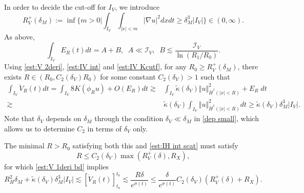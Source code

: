 \documentclass[reqno, 11pt]{amsart}
\numberwithin{equation}{section}
\theoremstyle{plain}
\theoremstyle{definition}
\numberwithin{equation}{section}
\numberwithin{theorem}{section}
\numberwithin{equation}{section}
\numberwithin{equation}{section}
\numberwithin{theorem}{section}
\begin{document}
	In order to decide the cut-off for $I_V$, we introduce
	\begin{equation*}
	R_{V}^{+}(\delta_{M}):=\inf\{m>0\Big|\int_{I_V}\int_{|x|<m} |\nabla u|^2 dxdt\geq \delta_{M}^3|I_V| \}\in (0,\infty).
	\end{equation*}
	As above,
	\begin{equation*}
	\int_{I_V} E_R(t)dt=A+B,\;\;A\ll \mathcal{I}_V,\;\;B\lesssim\frac{\mathcal{I}_V}{\ln (R_1/R_0)}.
	\end{equation*}
	Using \eqref{est:V 2deri}, \eqref{est:IV int} and \eqref{est:IV Kcutf}, for any $R_0 \geq R_{V}^{+}(\delta_{M})$, there exists $R\in \left(R_0,C_2(\delta_{V})R_0 \right)$ for some constant $C_2(\delta_{V})>1$ such that
	\begin{equation*}
	\begin{aligned}
	\int_{I_V} \ddot{V}_R(t)dt= \int_{I_V}8K(\phi_{R}u)
	+O(E_R)dt \gtrsim& \int_{I_V}\widetilde{\kappa}(\delta_{V}) \Vert u \Vert_{\dot H^1(|x|<R)}^2+E_R\; dt\\\gtrsim& \widetilde{\kappa}(\delta_{V})\int_{I_V} \Vert u \Vert_{\dot H^1(|x|<R)}^2 dt\geq \widetilde{\kappa}(\delta_{V})\delta_{M}^3|I_V|.
	\end{aligned}
	\end{equation*}
	Note that $\delta_{V}$ depends on $\delta_{M}$ through the condition $\delta_{V}\ll \delta_{M}$ in \eqref{dep small}, which allows us to determine $C_2$ in terms of $\delta_{V}$ only. 
	
	The minimal $R>R_0$ satisfying both this and \eqref{est:IH int scat} must satisfy
	\begin{equation*}
	R\leq C_2(\delta_{V})\max\left(R_{V}^{+}(\delta),R_X \right),
	\end{equation*}
	for which \eqref{est:V 1deri bd} implies
	\begin{equation}\label{vir all +}
	R_{H}^{2}\delta_{M}+\widetilde{\kappa}(\delta_{V})\delta_{M}^{3}|I_V|\lesssim [\dot{V}_R(t)]_{t_a}^{t_b} \lesssim \frac{R\delta}{e^{\sigma(t)}}  \leq \frac{\delta}{e^{\sigma(t)}} C_2(\delta_{V}) \left(  R_{V}^{+}(\delta)+R_{X}  \right).
	\end{equation}
	
\end{document}
